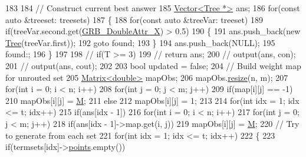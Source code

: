 \begin{DoxyCode}
183         
184         \textcolor{comment}{// Construct current best answer}
185         \hyperlink{classVector}{Vector<Tree *>} ans;
186         \textcolor{keywordflow}{for}(\textcolor{keyword}{const} \textcolor{keyword}{auto} &treeset: treesets)
187         \{
188             \textcolor{keywordflow}{for}(\textcolor{keyword}{const} \textcolor{keyword}{auto} &treeVar: treeset)
189                 \textcolor{keywordflow}{if}(treeVar.second.get(\hyperlink{gurobi__c_09_09_8h_a2f43cc28447ce1778973a1f7961e8180a88afa2b5caf4dd5e8b44785752f6940a}{GRB\_DoubleAttr\_X}) > 0.5)
190                 \{
191                     ans.push\_back(\textcolor{keyword}{new} \hyperlink{classTree}{Tree}(treeVar.first));
192                     \textcolor{keywordflow}{goto} found;
193                 \}
194             ans.push\_back(NULL);
195             found:;
196         \}
197         
198         \textcolor{comment}{// if(T >= 3)}
199             \textcolor{comment}{// return ans;}
200         \textcolor{comment}{// output(ans, con);}
201         \textcolor{comment}{// output(ans, cout);}
202         
203         \textcolor{keywordtype}{bool} updated = \textcolor{keyword}{false};
204         \textcolor{comment}{// Build weight map for unrouted set}
205         \hyperlink{classMatrix}{Matrix<double>} mapObs;
206         mapObs.\hyperlink{classMatrix_a15ce96c8af4c7a982c2c10b96f29cea1}{resize}(n, m);
207         \textcolor{keywordflow}{for}(\textcolor{keywordtype}{int} i = 0; i < n; i++)
208             \textcolor{keywordflow}{for}(\textcolor{keywordtype}{int} j = 0; j < m; j++)
209                 \textcolor{keywordflow}{if}(map[i][j] == -1)
210                     mapObs[i][j] = \hyperlink{classColumnGenSolve_ac5abb4d6dfd291b01af6ea006b5f9f5d}{M};
211                 \textcolor{keywordflow}{else}
212                     mapObs[i][j] = 1;
213         
214         \textcolor{keywordflow}{for}(\textcolor{keywordtype}{int} idx = 1; idx <= t; idx++)
215             \textcolor{keywordflow}{if}(ans[idx - 1])
216                 \textcolor{keywordflow}{for}(\textcolor{keywordtype}{int} i = 0; i < n; i++)
217                     \textcolor{keywordflow}{for}(\textcolor{keywordtype}{int} j = 0; j < m; j++)
218                         \textcolor{keywordflow}{if}(ans[idx - 1]->map.get(i, j))
219                             mapObs[i][j] = \hyperlink{classColumnGenSolve_ac5abb4d6dfd291b01af6ea006b5f9f5d}{M};
220         \textcolor{comment}{// Try to generate from each set}
221         \textcolor{keywordflow}{for}(\textcolor{keywordtype}{int} idx = 1; idx <= t; idx++)
222         \{
223             \textcolor{keywordflow}{if}(termsets[idx]->\hyperlink{classes_8txt_ae368e6252d0add75ea011d5d90db68ed}{points}.empty())

\end{DoxyCode}
